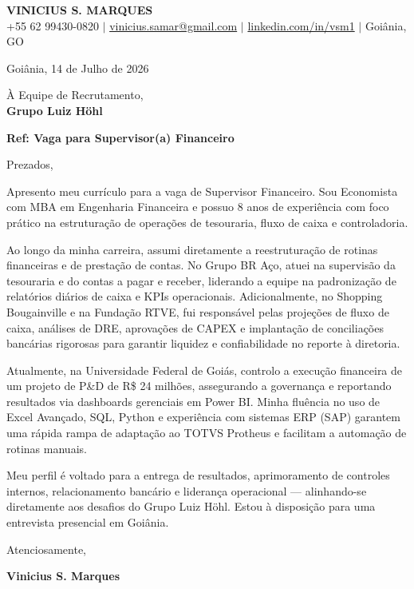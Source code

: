 \documentclass[letterpaper,11pt]{article}
\begin{document}
\begin{center}
    \textbf{\Huge VINICIUS S. MARQUES} \\ \vspace{5pt}
    \small +55 62 99430-0820 $|$ \href{mailto:vinicius.samar@gmail.com}{vinicius.samar@gmail.com} $|$ 
    \href{https://www.linkedin.com/in/vsm1}{linkedin.com/in/vsm1} $|$ Goiânia, GO
\end{center}

\vspace{2em}

Goiânia, 14 de Julho de 2026

À Equipe de Recrutamento,\\
\textbf{Grupo Luiz Höhl}

\textbf{Ref: Vaga para Supervisor(a) Financeiro}

Prezados,

Apresento meu currículo para a vaga de Supervisor Financeiro. Sou Economista com MBA em Engenharia Financeira e possuo 8 anos de experiência com foco prático na estruturação de operações de tesouraria, fluxo de caixa e controladoria.

Ao longo da minha carreira, assumi diretamente a reestruturação de rotinas financeiras e de prestação de contas. No Grupo BR Aço, atuei na supervisão da tesouraria e do contas a pagar e receber, liderando a equipe na padronização de relatórios diários de caixa e KPIs operacionais. Adicionalmente, no Shopping Bougainville e na Fundação RTVE, fui responsável pelas projeções de fluxo de caixa, análises de DRE, aprovações de CAPEX e implantação de conciliações bancárias rigorosas para garantir liquidez e confiabilidade no reporte à diretoria.

Atualmente, na Universidade Federal de Goiás, controlo a execução financeira de um projeto de P\&D de R\$ 24 milhões, assegurando a governança e reportando resultados via dashboards gerenciais em Power BI. Minha fluência no uso de Excel Avançado, SQL, Python e experiência com sistemas ERP (SAP) garantem uma rápida rampa de adaptação ao TOTVS Protheus e facilitam a automação de rotinas manuais.

Meu perfil é voltado para a entrega de resultados, aprimoramento de controles internos, relacionamento bancário e liderança operacional — alinhando-se diretamente aos desafios do Grupo Luiz Höhl. Estou à disposição para uma entrevista presencial em Goiânia.

Atenciosamente,

\vspace{1.5em}
\textbf{Vinicius S. Marques}
\end{document}
